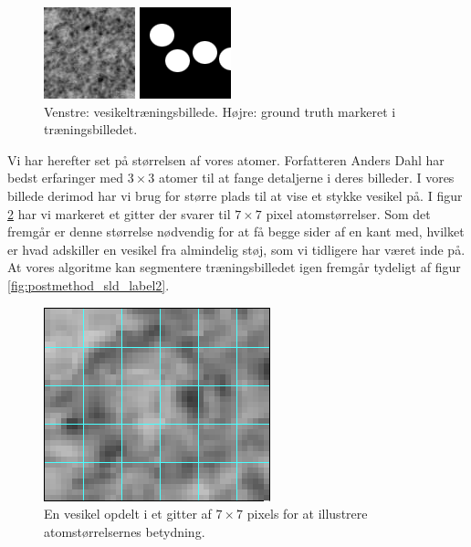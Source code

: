 \begin{figure}[H]
	\begin{minipage}[b]{0.5\linewidth}
		\centering
		\includegraphics[scale=3]{files/postmethod/img/imTrain2.png}
	\end{minipage}
	\hspace{0.5cm}
	\begin{minipage}[b]{0.5\linewidth}
		\centering
		\includegraphics[scale=3]{files/postmethod/img/imGT2.png}
	\end{minipage}
	\caption{Venstre: vesikeltræningsbillede. Højre: ground truth markeret i træningsbilledet.\label{fig:postmethod_sld_train2}}
\end{figure}

Vi har herefter set på størrelsen af vores atomer. Forfatteren Anders Dahl har bedst erfaringer med $3\times3$ atomer til at fange detaljerne i deres billeder. I vores billede derimod har vi brug for større plads til at vise et stykke vesikel på. I figur \ref{fig:postmethod_ves_grid} har vi markeret et gitter der svarer til $7\times7$ pixel atomstørrelser. Som det fremgår er denne størrelse nødvendig for at få begge sider af en kant med, hvilket er hvad adskiller en vesikel fra almindelig støj, som vi tidligere har været inde på. %
At vores algoritme kan segmentere træningsbilledet igen fremgår tydeligt af figur \ref{fig:postmethod_sld_label2}.

\begin{figure}[H]
		\centering
		\includegraphics[scale=1]{files/postmethod/img/ves_grid.png}
	\caption{En vesikel opdelt i et gitter af $7\times7$ pixels for at illustrere atomstørrelsernes betydning. \label{fig:postmethod_ves_grid}}
\end{figure}

